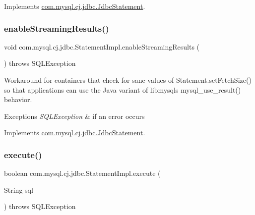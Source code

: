 Implements \mbox{\hyperlink{interfacecom_1_1mysql_1_1cj_1_1jdbc_1_1_jdbc_statement_a11240571041f264e6bdde12ee05355a5}{com.\+mysql.\+cj.\+jdbc.\+Jdbc\+Statement}}.

\mbox{\label{classcom_1_1mysql_1_1cj_1_1jdbc_1_1_statement_impl_a973ff5045e258a5c3e156887c116c976}} 
\subsubsection{\texorpdfstring{enable\+Streaming\+Results()}{enableStreamingResults()}}
{\footnotesize\ttfamily void com.\+mysql.\+cj.\+jdbc.\+Statement\+Impl.\+enable\+Streaming\+Results (\begin{DoxyParamCaption}{ }\end{DoxyParamCaption}) throws S\+Q\+L\+Exception}

Workaround for containers that \textquotesingle{}check\textquotesingle{} for sane values of Statement.\+set\+Fetch\+Size() so that applications can use the Java variant of libmysql\textquotesingle{}s mysql\+\_\+use\+\_\+result() behavior.


\begin{DoxyExceptions}{Exceptions}
{\em S\+Q\+L\+Exception} & if an error occurs \\
\hline
\end{DoxyExceptions}


Implements \mbox{\hyperlink{interfacecom_1_1mysql_1_1cj_1_1jdbc_1_1_jdbc_statement_a35049f45e6278dc1b824812acbe75556}{com.\+mysql.\+cj.\+jdbc.\+Jdbc\+Statement}}.

\mbox{\label{classcom_1_1mysql_1_1cj_1_1jdbc_1_1_statement_impl_a55932ba2147827cc8b76353c14332c1f}} 
\subsubsection{\texorpdfstring{execute()}{execute()}\hspace{0.1cm}{\footnotesize\ttfamily [1/4]}}
{\footnotesize\ttfamily boolean com.\+mysql.\+cj.\+jdbc.\+Statement\+Impl.\+execute (\begin{DoxyParamCaption}\item[{String}]{sql }\end{DoxyParamCaption}) throws S\+Q\+L\+Exception}

